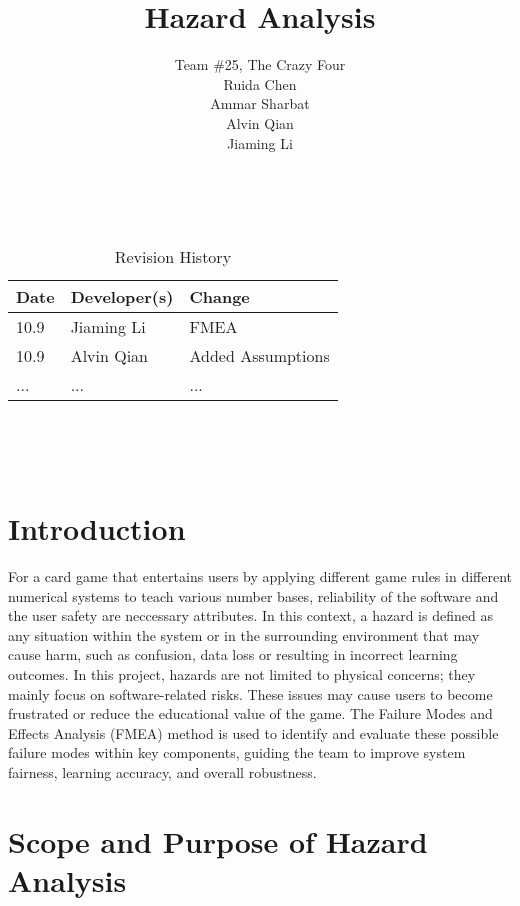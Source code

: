 \documentclass{article}
\title{Hazard Analysis\\\progname}
\author{
    Team \#25, The Crazy Four \\[1ex]
    Ruida Chen \\
    Ammar Sharbat \\
    Alvin Qian \\
    Jiaming Li
}
\date{}
\begin{document}
\maketitle
\thispagestyle{empty}

~\newpage


\begin{table}[hp]
\caption{Revision History} \label{TblRevisionHistory}
\begin{tabularx}{\textwidth}{llX}
\toprule
\textbf{Date} & \textbf{Developer(s)} & \textbf{Change}\\
\midrule
10.9 & Jiaming Li & FMEA\\
10.9 & Alvin Qian & Added Assumptions\\
... & ... & ...\\
\bottomrule
\end{tabularx}
\end{table}

~\newpage

\tableofcontents

~\newpage



\section{Introduction}

For a card game that entertains users by applying different game rules in different numerical systems to teach various number bases, reliability of the software and the user safety are neccessary attributes. In this context, a hazard is defined as any situation within the system or in the surrounding environment that may cause harm, such as confusion, data loss or resulting in incorrect learning outcomes. In this project, hazards are not limited to physical concerns; they mainly focus on software-related risks. These issues may cause users to become frustrated or reduce the educational value of the game. The Failure Modes and Effects Analysis (FMEA) method is used to identify and evaluate these possible failure modes within key components, guiding the team to improve system fairness, learning accuracy, and overall robustness.

\section{Scope and Purpose of Hazard Analysis}
\end{document}
